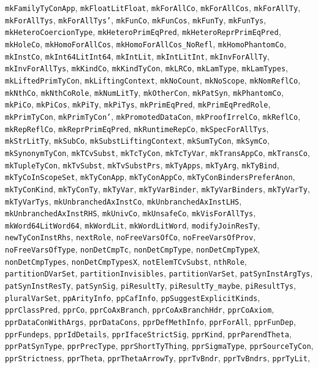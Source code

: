 \texttt{mkFamilyTyConApp}, \texttt{mkFloatLitFloat}, \texttt{mkForAllCo}, \texttt{mkForAllCos}, \texttt{mkForAllTy}, \texttt{mkForAllTys}, \texttt{mkForAllTys'}, \texttt{mkFunCo}, \texttt{mkFunCos}, \texttt{mkFunTy}, \texttt{mkFunTys}, \texttt{mkHeteroCoercionType}, \texttt{mkHeteroPrimEqPred}, \texttt{mkHeteroReprPrimEqPred}, \texttt{mkHoleCo}, \texttt{mkHomoForAllCos}, \texttt{mkHomoForAllCos_NoRefl}, \texttt{mkHomoPhantomCo}, \texttt{mkInstCo}, \texttt{mkInt64LitInt64}, \texttt{mkIntLit}, \texttt{mkIntLitInt}, \texttt{mkInvForAllTy}, \texttt{mkInvForAllTys}, \texttt{mkKindCo}, \texttt{mkKindTyCon}, \texttt{mkLRCo}, \texttt{mkLamType}, \texttt{mkLamTypes}, \texttt{mkLiftedPrimTyCon}, \texttt{mkLiftingContext}, \texttt{mkNoCount}, \texttt{mkNoScope}, \texttt{mkNomReflCo}, \texttt{mkNthCo}, \texttt{mkNthCoRole}, \texttt{mkNumLitTy}, \texttt{mkOtherCon}, \texttt{mkPatSyn}, \texttt{mkPhantomCo}, \texttt{mkPiCo}, \texttt{mkPiCos}, \texttt{mkPiTy}, \texttt{mkPiTys}, \texttt{mkPrimEqPred}, \texttt{mkPrimEqPredRole}, \texttt{mkPrimTyCon}, \texttt{mkPrimTyCon'}, \texttt{mkPromotedDataCon}, \texttt{mkProofIrrelCo}, \texttt{mkReflCo}, \texttt{mkRepReflCo}, \texttt{mkReprPrimEqPred}, \texttt{mkRuntimeRepCo}, \texttt{mkSpecForAllTys}, \texttt{mkStrLitTy}, \texttt{mkSubCo}, \texttt{mkSubstLiftingContext}, \texttt{mkSumTyCon}, \texttt{mkSymCo}, \texttt{mkSynonymTyCon}, \texttt{mkTCvSubst}, \texttt{mkTcTyCon}, \texttt{mkTcTyVar}, \texttt{mkTransAppCo}, \texttt{mkTransCo}, \texttt{mkTupleTyCon}, \texttt{mkTvSubst}, \texttt{mkTvSubstPrs}, \texttt{mkTyApps}, \texttt{mkTyArg}, \texttt{mkTyBind}, \texttt{mkTyCoInScopeSet}, \texttt{mkTyConApp}, \texttt{mkTyConAppCo}, \texttt{mkTyConBindersPreferAnon}, \texttt{mkTyConKind}, \texttt{mkTyConTy}, \texttt{mkTyVar}, \texttt{mkTyVarBinder}, \texttt{mkTyVarBinders}, \texttt{mkTyVarTy}, \texttt{mkTyVarTys}, \texttt{mkUnbranchedAxInstCo}, \texttt{mkUnbranchedAxInstLHS}, \texttt{mkUnbranchedAxInstRHS}, \texttt{mkUnivCo}, \texttt{mkUnsafeCo}, \texttt{mkVisForAllTys}, \texttt{mkWord64LitWord64}, \texttt{mkWordLit}, \texttt{mkWordLitWord}, \texttt{modifyJoinResTy}, \texttt{newTyConInstRhs}, \texttt{nextRole}, \texttt{noFreeVarsOfCo}, \texttt{noFreeVarsOfProv}, \texttt{noFreeVarsOfType}, \texttt{nonDetCmpTc}, \texttt{nonDetCmpType}, \texttt{nonDetCmpTypeX}, \texttt{nonDetCmpTypes}, \texttt{nonDetCmpTypesX}, \texttt{notElemTCvSubst}, \texttt{nthRole}, \texttt{partitionDVarSet}, \texttt{partitionInvisibles}, \texttt{partitionVarSet}, \texttt{patSynInstArgTys}, \texttt{patSynInstResTy}, \texttt{patSynSig}, \texttt{piResultTy}, \texttt{piResultTy_maybe}, \texttt{piResultTys}, \texttt{pluralVarSet}, \texttt{ppArityInfo}, \texttt{ppCafInfo}, \texttt{ppSuggestExplicitKinds}, \texttt{pprClassPred}, \texttt{pprCo}, \texttt{pprCoAxBranch}, \texttt{pprCoAxBranchHdr}, \texttt{pprCoAxiom}, \texttt{pprDataConWithArgs}, \texttt{pprDataCons}, \texttt{pprDefMethInfo}, \texttt{pprForAll}, \texttt{pprFunDep}, \texttt{pprFundeps}, \texttt{pprIdDetails}, \texttt{pprIfaceStrictSig}, \texttt{pprKind}, \texttt{pprParendTheta}, \texttt{pprPatSynType}, \texttt{pprPrecType}, \texttt{pprShortTyThing}, \texttt{pprSigmaType}, \texttt{pprSourceTyCon}, \texttt{pprStrictness}, \texttt{pprTheta}, \texttt{pprThetaArrowTy}, \texttt{pprTvBndr}, \texttt{pprTvBndrs}, \texttt{pprTyLit}, 